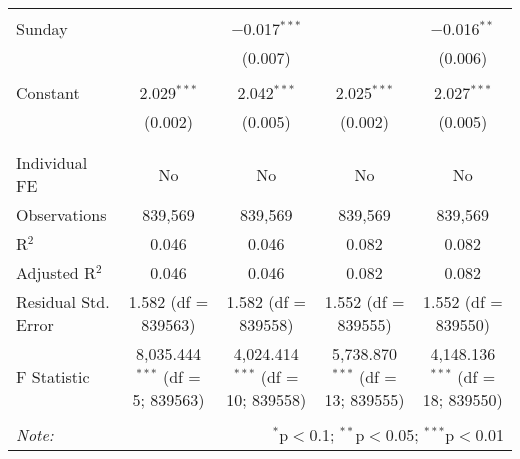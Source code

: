 \documentclass[
]{article}
\begin{document}
\begin{table}[!htbp]
{\begin{tabular}{@{\extracolsep{5pt}}lcccc}
  & & & & \\ 
 Sunday &  & $-$0.017$^{***}$ &  & $-$0.016$^{**}$ \\ 
  &  & (0.007) &  & (0.006) \\ 
  & & & & \\ 
 Constant & 2.029$^{***}$ & 2.042$^{***}$ & 2.025$^{***}$ & 2.027$^{***}$ \\ 
  & (0.002) & (0.005) & (0.002) & (0.005) \\ 
  & & & & \\ 
\hline \\[-1.8ex] 
Individual FE & No & No & No & No \\ 
Observations & 839,569 & 839,569 & 839,569 & 839,569 \\ 
R$^{2}$ & 0.046 & 0.046 & 0.082 & 0.082 \\ 
Adjusted R$^{2}$ & 0.046 & 0.046 & 0.082 & 0.082 \\ 
Residual Std. Error & 1.582 (df = 839563) & 1.582 (df = 839558) & 1.552 (df = 839555) & 1.552 (df = 839550) \\ 
F Statistic & 8,035.444$^{***}$ (df = 5; 839563) & 4,024.414$^{***}$ (df = 10; 839558) & 5,738.870$^{***}$ (df = 13; 839555) & 4,148.136$^{***}$ (df = 18; 839550) \\ 
\hline 
\hline \\[-1.8ex] 
\textit{Note:}  & \multicolumn{4}{r}{$^{*}$p$<$0.1; $^{**}$p$<$0.05; $^{***}$p$<$0.01} \\ 
\end{tabular}
} 
\end{table} 
\newpage
\end{document}
